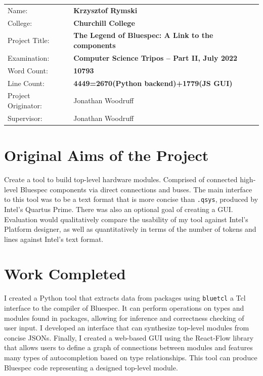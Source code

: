 \documentclass[12pt]{report}
\begin{document}
{\large
\begin{tabular}{ll}
Name:               & \bf Krzysztof Rymski                      \\
College:            & \bf Churchill College                     \\
Project Title:      & \bf The Legend of Bluespec: A Link to the components \\
Examination:        & \bf Computer Science Tripos -- Part II, July 2022  \\
Word Count:         & \bf 10793 \footnotemark[1]  \\
Line Count:         & \bf 4449=2670(Python backend)+1779(JS GUI) \footnotemark[2]  \\
Project Originator: & Jonathan Woodruff                   \\
Supervisor:         & Jonathan Woodruff                    \\ 
\end{tabular}
}



\section*{Original Aims of the Project}

Create a tool to build top-level hardware modules. Comprised of connected high-level Bluespec components via direct connections and buses. The main interface to this tool was to be a text format that is more concise than \verb!.qsys!, produced by Intel's Quartus Prime. There was also an optional goal of creating a GUI. Evaluation would qualitatively compare the usability of my tool against Intel's Platform designer, as well as quantitatively in terms of the number of tokens and lines against Intel's text format.

\section*{Work Completed}

I created a Python tool that extracts data from packages using \verb!bluetcl! a Tcl interface to the compiler of Bluespec. It can perform operations on types and modules found in packages, allowing for inference and correctness checking of user input. I developed an interface that can synthesize top-level modules from concise JSONs. Finally, I created a web-based GUI using the React-Flow library that allows users to define a graph of connections between modules and features many types of autocompletion based on type relationships. This tool can produce Bluespec code representing a designed top-level module.
\end{document}
